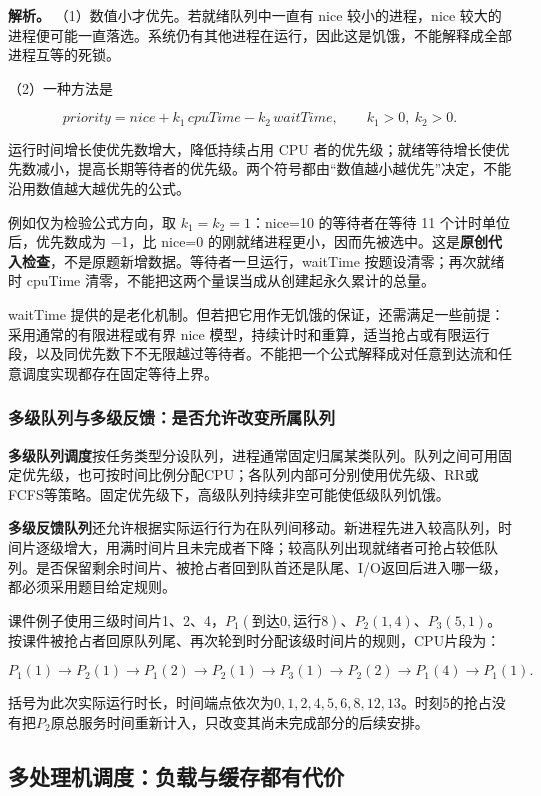 \textbf{解析。} （1）数值小才优先。若就绪队列中一直有 nice 较小的进程，nice 较大的进程便可能一直落选。系统仍有其他进程在运行，因此这是饥饿，不能解释成全部进程互等的死锁。

（2）一种方法是

\[priority=nice+k_1\,cpuTime-k_2\,waitTime,\qquad k_1>0,\ k_2>0.\]

运行时间增长使优先数增大，降低持续占用 CPU 者的优先级；就绪等待增长使优先数减小，提高长期等待者的优先级。两个符号都由``数值越小越优先''决定，不能沿用数值越大越优先的公式。

例如仅为检验公式方向，取 \(k_1=k_2=1\)：nice=10 的等待者在等待 11 个计时单位后，优先数成为 \ensuremath{-}1，比 nice=0 的刚就绪进程更小，因而先被选中。这是\textbf{原创代入检查}，不是原题新增数据。等待者一旦运行，waitTime 按题设清零；再次就绪时 cpuTime 清零，不能把这两个量误当成从创建起永久累计的总量。

waitTime 提供的是老化机制。但若把它用作无饥饿的保证，还需满足一些前提：采用通常的有限进程或有界 nice 模型，持续计时和重算，适当抢占或有限运行段，以及同优先数下不无限越过等待者。不能把一个公式解释成对任意到达流和任意调度实现都存在固定等待上界。

\subsubsection{多级队列与多级反馈：是否允许改变所属队列}\label{OS02-multiqueue}

\textbf{多级队列调度}按任务类型分设队列，进程通常固定归属某类队列。队列之间可用固定优先级，也可按时间比例分配CPU；各队列内部可分别使用优先级、RR或FCFS等策略。固定优先级下，高级队列持续非空可能使低级队列饥饿。

\textbf{多级反馈队列}还允许根据实际运行行为在队列间移动。新进程先进入较高队列，时间片逐级增大，用满时间片且未完成者下降；较高队列出现就绪者可抢占较低队列。是否保留剩余时间片、被抢占者回到队首还是队尾、I/O返回后进入哪一级，都必须采用题目给定规则。

课件例子使用三级时间片1、2、4，\(P_1(到达0,运行8)\)、\(P_2(1,4)\)、\(P_3(5,1)\)。按课件被抢占者回原队列尾、再次轮到时分配该级时间片的规则，CPU片段为：

\[P_1(1)\to P_2(1)\to P_1(2)\to P_2(1)\to P_3(1)\to P_2(2)\to P_1(4)\to P_1(1).\]

括号为此次实际运行时长，时间端点依次为\(0,1,2,4,5,6,8,12,13\)。时刻5的抢占没有把\(P_2\)原总服务时间重新计入，只改变其尚未完成部分的后续安排。

\subsection{多处理机调度：负载与缓存都有代价}\label{OS02-2-9}

